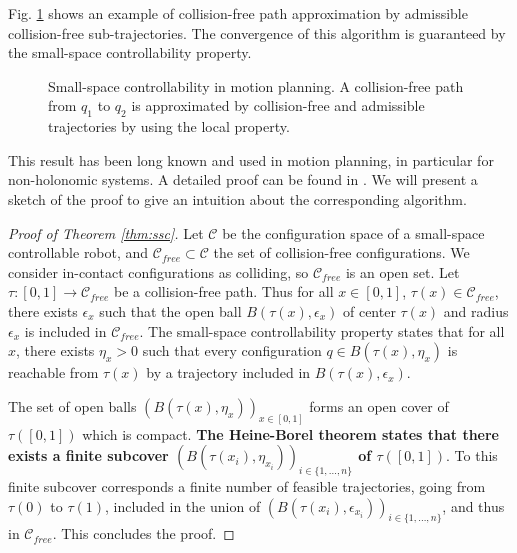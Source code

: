 \documentclass{article}
\begin{document}
Fig. \ref{fig:ssc2} shows an example of collision-free 
path approximation by admissible collision-free sub-trajectories. The convergence 
of this algorithm is guaranteed by the small-space
controllability property.

\begin{figure}[h]
  \centering

  

  \caption{Small-space controllability in motion planning. 
    A collision-free path from
    $q_1$ to $q_2$ is approximated by collision-free and admissible
    trajectories by using the local property.
  }
  \label{fig:ssc2}
\end{figure}

This result has been long known and used in motion planning, in particular
for non-holonomic systems. A detailed proof can be found in
\cite{taix-94}. We will present a sketch of the proof to give an intuition about the 
corresponding algorithm.

\begin{proof}[Proof of Theorem \ref{thm:ssc}]
  Let $\mathcal{C}$ be the configuration space of a small-space controllable robot, and 
  $\mathcal{C}_{free} \subset \mathcal{C}$ the set of collision-free configurations. We
  consider in-contact configurations as colliding, so $\mathcal{C}_{free}$ is an open set.
  Let $\tau : [0,1] \rightarrow \mathcal{C}_{free}$ be a collision-free path. Thus for all $x \in [0,1]$,
  $\tau(x) \in \mathcal{C}_{free}$, there exists $\epsilon_x$ such that the open ball 
  $B(\tau(x),\epsilon_x)$ of center $\tau(x)$ and radius $\epsilon_x$ is included in 
  $\mathcal{C}_{free}$. The small-space controllability property states that for all $x$,
  there exists $\eta_x > 0$ such that every configuration $q \in B(\tau(x),\eta_x)$ is reachable 
  from $\tau(x)$ by a trajectory included in $B(\tau(x),\epsilon_x)$.

  The set of open balls $\left( B(\tau(x),\eta_x) \right)_{x\in [0,1]}$ forms an open cover
  of $\tau([0,1])$ which is compact. \textbf{The Heine-Borel theorem \cite{fitzpatrick2006advanced} states that there exists a
  finite subcover $\left( B(\tau(x_i),\eta_{x_i}) \right)_{i\in \{ 1,\dots ,n \}}$ of $\tau([0,1])$}. To this
  finite subcover corresponds a finite number of feasible trajectories, going from $\tau(0)$ to  
  $\tau(1)$, included in the union of 
  $\left( B(\tau(x_i),\epsilon_{x_i}) \right)_{i\in \{ 1,\dots ,n \}}$, and thus in 
  $\mathcal{C}_{free}$. This concludes the proof.
\end{proof}
\end{document}
